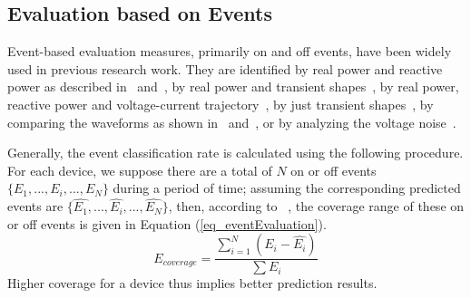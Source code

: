 \subsection{Evaluation based on Events}
Event-based evaluation measures, primarily on and off events, have been widely used in 
previous research work. 
They are identified by real power and reactive power as described in~\cite{berges2009learning} and~\cite{chang2010newmethod},
by real power and transient shapes~\cite{froehlich2011disaggregated},
by real power, reactive power and voltage-current trajectory~\cite{yang2007design},
by just transient shapes~\cite{chang2008load},
by comparing the waveforms as shown in~\cite{suzuki2008nonintrusive} and~\cite{berges2010enhancing},
or by analyzing the voltage noise~\cite{patel2007flick}.

Generally, the event classification rate is
calculated using the following procedure.
For each device,
we suppose there are a total of $N$ on or off events 
$\{E_1, ..., E_i, ..., E_N\}$ during
a period of time;
assuming the corresponding predicted events are
$\{\hat{E_1}, ..., \hat{E_i},...,\hat{E_N}\}$,
then, according to ~\cite{nakano2007non}, the coverage range of these on or off events is
given in Equation (\ref{eq_eventEvaluation}).
\begin{equation}
\label{eq_eventEvaluation}
E_{coverage} = \frac{\sum_{i=1}^N (E_i - \hat{E_i})}{\sum E_i}
\end{equation}
Higher coverage for a device thus implies better prediction results.




